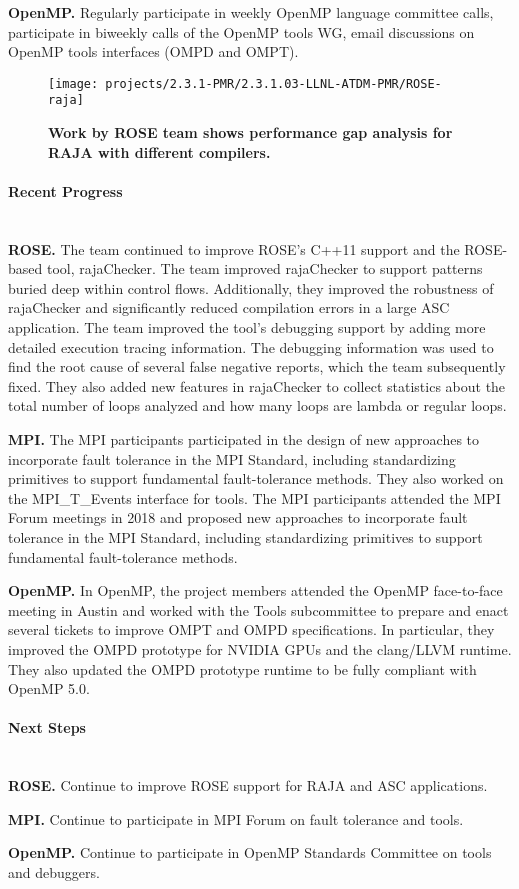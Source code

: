\textbf{OpenMP.} Regularly participate in weekly OpenMP language committee calls, participate in biweekly calls of the OpenMP tools WG, email discussions on OpenMP tools interfaces (OMPD and OMPT).

\begin{figure}[htb]
        \centering
        \texttt{[image: projects/2.3.1-PMR/2.3.1.03-LLNL-ATDM-PMR/ROSE-raja]}
        \caption{\label{fig:rose-raja}\textbf{Work by ROSE team shows
performance gap analysis for RAJA with different compilers.}}
\end{figure}




\paragraph{Recent Progress} \leavevmode \\



\textbf{ROSE.} The team continued to improve ROSE's C++11 support 
and the ROSE-based 
tool, rajaChecker. 
The team improved rajaChecker to support patterns buried deep within control 
flows. Additionally, they improved the robustness of rajaChecker and 
significantly reduced compilation errors in a large ASC application.
The team improved the tool's debugging support by adding more detailed
execution tracing information. The debugging information was used to
find the root cause of several false negative reports, which the team 
subsequently fixed. They also added new features in rajaChecker to
collect statistics about the total number of loops analyzed and how 
many loops are lambda or regular loops.



\textbf{MPI.} The MPI participants participated in the design of new 
approaches to incorporate fault tolerance in the MPI Standard, including 
standardizing primitives to support fundamental fault-tolerance methods.  
They also worked on the MPI\_T\_Events interface for tools.
The MPI participants attended the MPI Forum meetings in 2018
and proposed new approaches to incorporate fault tolerance in the 
MPI Standard, including standardizing primitives to support fundamental 
fault-tolerance methods.

\textbf{OpenMP.} In OpenMP, 
the project members attended the OpenMP 
face-to-face meeting in Austin and worked with the Tools subcommittee 
to prepare and enact several tickets to improve OMPT and OMPD 
specifications. In particular, they improved the OMPD prototype for
NVIDIA GPUs and the clang/LLVM runtime. They also updated the OMPD
prototype runtime to be fully compliant with OpenMP 5.0.


\paragraph{Next Steps}  \leavevmode \\


\textbf{ROSE.} Continue to improve ROSE support for RAJA and ASC applications.

\textbf{MPI.} Continue to participate in MPI Forum on fault tolerance and
tools.

\textbf{OpenMP.} Continue to participate in OpenMP Standards Committee
on tools and debuggers.
